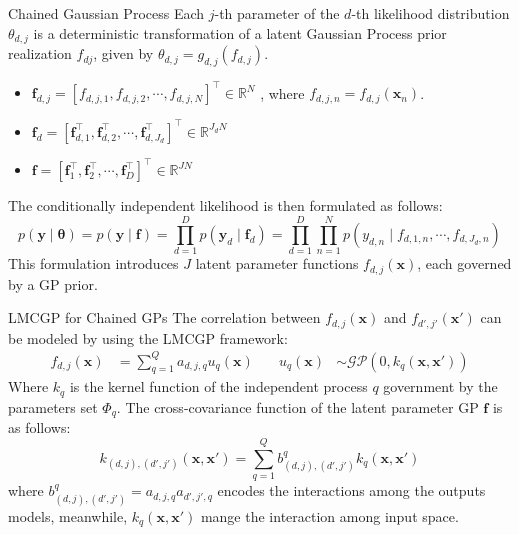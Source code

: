 \begin{frame}{Chained Gaussian Process}
	Each $j$-th parameter of the $d$-th likelihood distribution $\theta_{d,j}$ is a deterministic transformation of a latent Gaussian Process prior realization $f_{dj}$, given by $\theta_{d,j} = g_{d,j}(f_{d,j})$.
	\begin{itemize}
		\item $\mathbf{f}_{d,j} = [f_{d,j,1}, f_{d,j,2}, \cdots, f_{d,j,N}]^\top \in \mathbb{R}^{N}$ , where $f_{d,j,n} = f_{d,j}(\mathbf{x}_n)$.
		\item $\mathbf{f}_{d} = [\mathbf{f}_{d,1}^\top, \mathbf{f}_{d,2}^\top, \cdots, \mathbf{f}_{d,J_d}^\top]^\top \in \mathbb{R}^{J_dN}$ 
		\item $\mathbf{f} = [\mathbf{f}_1^\top, \mathbf{f}_2^\top, \cdots, \mathbf{f}_D^\top]^\top \in \mathbb{R}^{JN}$ 
	\end{itemize}
	
	The conditionally independent likelihood is then formulated as follows: \begin{equation*}
		p(\mathbf{y} \mid \boldsymbol{\theta}) = p(\mathbf{y} \mid \mathbf{f}) = \prod_{d=1}^D p(\mathbf{y}_d\mid \mathbf{f}_{d}) = \prod_{d=1}^D \prod_{n=1}^N p(y_{d,n}\mid f_{d,1,n}, \cdots, f_{d, J_d, n})
	\end{equation*}
	This formulation introduces $J$ latent parameter functions $f_{d,j}(\mathbf{x})$, each governed by a GP prior.
	
\end{frame}

\begin{frame}{LMCGP for Chained GPs}
	The correlation between \(f_{d,j}(\mathbf{x})\) and \(f_{d',j'}(\mathbf{x}')\) can be modeled by using the LMCGP framework:
	\begin{equation*}
		\begin{aligned}
			f_{d,j}(\mathbf{x}) &= \sum_{q=1}^Q a_{d,j,q} u_{q}(\mathbf{x}) \quad &
			u_{q}(\mathbf{x}) &\sim \mathcal{GP}(0, k_{q}(\mathbf{x}, \mathbf{x}')) 
		\end{aligned}\label{eq:chd_cov}
	\end{equation*}
	Where $k_q$ is the kernel function of the independent process $q$ government by the parameters set $\Phi_q$. The cross-covariance function of the latent parameter GP $\mathbf{f}$ is as follows:
	\begin{equation*}
			k_{(d,j), (d',j')}(\mathbf{x}, \mathbf{x}') =\sum_{q=1}^Q b^q_{(d,j), (d',j')} k_{q}(\mathbf{x}, \mathbf{x}')
	\end{equation*}
	where $b^q_{(d,j), (d',j')} = a_{d,j,q}a_{d',j',q}$ encodes the interactions among the outputs models, meanwhile, $k_{q}(\mathbf{x}, \mathbf{x}')$ mange the interaction among input space.
\end{frame}


